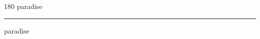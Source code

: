 
\begin{frame}
\begin{center}
\begin{turn}{180}
{\fontsize{2.5cm}{1em}\selectfont paradise}
\end{turn}
\vspace{1em}\par  
\hrule
\vspace{1em}\par  
{\fontsize{2.5cm}{1em}\selectfont paradise}
\end{center}
\end{frame}

